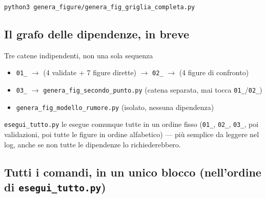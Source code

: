 \documentclass[11pt,a4paper]{article}
\newcommand{\code}[1]{\texttt{\small #1}}
\begin{document}
\begin{keyeq}[title={genera\_fig\_griglia\_completa.py $\to$ fig\_passo5\_griglia\_completa}]
\code{python3 genera\_figure/genera\_fig\_griglia\_completa.py}
\end{keyeq}

\subsection{Il grafo delle dipendenze, in breve}

\begin{okbox}{Tre catene indipendenti, non una sola sequenza}
\begin{itemize}[leftmargin=1.3em,itemsep=0.15em]
\item \code{01\_} $\to$ (4 validate + 7 figure dirette) $\to$ \code{02\_} $\to$ (4 figure di confronto)
\item \code{03\_} $\to$ \code{genera\_fig\_secondo\_punto.py} (catena separata, mai tocca \code{01\_}/\code{02\_})
\item \code{genera\_fig\_modello\_rumore.py} (isolato, nessuna dipendenza)
\end{itemize}
\code{esegui\_tutto.py} le esegue comunque tutte in un ordine fisso
(\code{01\_}, \code{02\_}, \code{03\_}, poi validazioni, poi tutte le
figure in ordine alfabetico) --- più semplice da leggere nel log, anche
se non tutte le dipendenze lo richiederebbero.
\end{okbox}

\subsection{Tutti i comandi, in un unico blocco (nell'ordine di \texttt{esegui\_tutto.py})}
\end{document}
